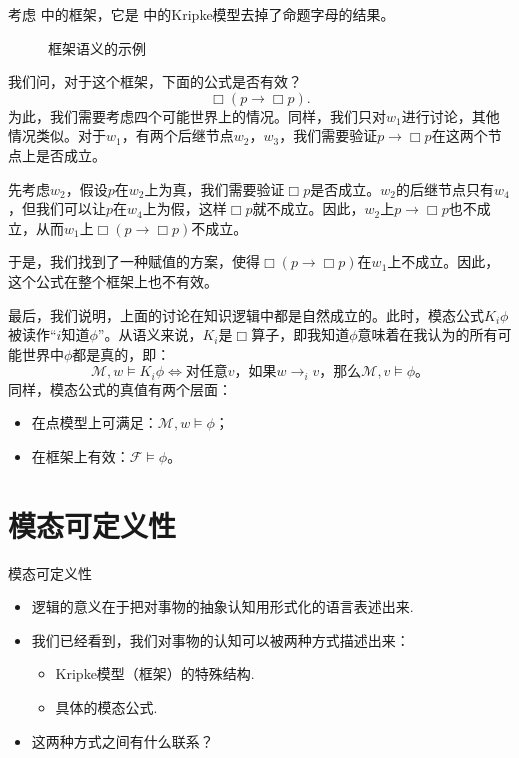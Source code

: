 \begin{example}\label{ex:modal-logic-frame-validity}
考虑 中的框架，它是 中的Kripke模型去掉了命题字母的结果。
\begin{figure}[ht]
\centering

\caption{框架语义的示例} \label{fig:frame-validity}
\end{figure}

我们问，对于这个框架，下面的公式是否有效？
\[\Box (p\to\Box p).\]
为此，我们需要考虑四个可能世界上的情况。同样，我们只对$w_1$进行讨论，其他情况类似。对于$w_1$，有两个后继节点$w_2$，$w_3$，我们需要验证$p\to\Box p$在这两个节点上是否成立。

先考虑$w_2$，假设$p$在$w_2$上为真，我们需要验证$\Box p$是否成立。$w_2$的后继节点只有$w_4$，但我们可以让$p$在$w_4$上为假，这样$\Box p$就不成立。因此，$w_2$上$p\to\Box p$也不成立，从而$w_1$上$\Box (p\to\Box p)$不成立。

于是，我们找到了一种赋值的方案，使得$\Box (p\to\Box p)$在$w_1$上不成立。因此，这个公式在整个框架上也不有效。
\end{example}


最后，我们说明，上面的讨论在知识逻辑中都是自然成立的。此时，模态公式$K_i\phi$被读作“$i$知道$\phi$”。从语义来说，$K_i$是$\Box$算子，即我知道$\phi$意味着在我认为的所有可能世界中$\phi$都是真的，即：
\[
\mathcal M,w\vDash K_i\phi\Longleftrightarrow\text{对任意$v$，如果$w\to_i v$，那么$\mathcal M,v\vDash\phi$}。
\]
同样，模态公式的真值有两个层面：
\begin{itemize}
\item 在点模型上可满足：$\mathcal M,w\vDash\phi$；
\item 在框架上有效：$\mathcal F\vDash\phi$。
\end{itemize}

\section{模态可定义性}


\begin{frame}{模态可定义性}
\begin{itemize}
    \item 逻辑的意义在于把对事物的抽象认知用形式化的语言表述出来.
    \item 我们已经看到，我们对事物的认知可以被两种方式描述出来：
    \begin{itemize}
        \item Kripke模型（框架）的特殊结构.
        \item 具体的模态公式.
    \end{itemize}
    \item 这两种方式之间有什么联系？
\end{itemize}
\end{frame}

